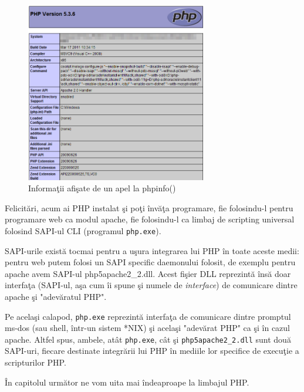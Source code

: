\begin{figure}[ht!]
  \centering
    \includegraphics[width=300px]{cap01/Screenshot-15.png}
  \caption{Informaţii afişate de un apel la phpinfo()}
  \label{img:php phpinfo}
\end{figure}

Felicitări, acum ai PHP instalat şi poţi învăţa programare, fie folosindu-l pentru programare web
ca modul apache, fie folosindu-l ca limbaj de scripting universal folosind SAPI-ul CLI (programul \texttt{php.exe}).

SAPI-urile există tocmai pentru a uşura integrarea lui PHP în toate aceste medii: pentru web putem folosi
un SAPI specific daemonului folosit, de exemplu pentru apache avem SAPI-ul php5apache2\_2.dll.
Acest fişier DLL reprezintă însă doar interfaţa (SAPI-ul, aşa cum îi spune şi numele de \textsl{interface})
de comunicare dintre apache şi "adevăratul PHP".

Pe acelaşi calapod, \texttt{php.exe} reprezintă interfaţa de comunicare dintre promptul ms-dos
(sau shell, într-un sistem *NIX) şi acelaşi "adevărat PHP" ca şi în cazul apache. Altfel spus,
ambele, atât \texttt{php.exe}, cât şi \texttt{php5apache2\_2.dll} sunt două SAPI-uri,
fiecare destinate integrării lui PHP în mediile lor specifice de execuţie a scripturilor PHP.

În capitolul următor ne vom uita mai îndeaproape la limbajul PHP.

